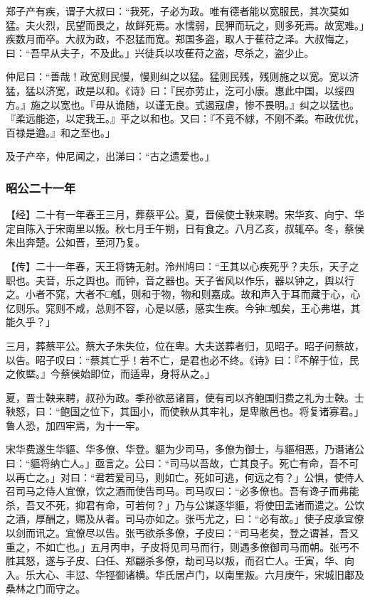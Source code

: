 \documentclass[]{article}
\begin{document}
郑子产有疾，谓子大叔曰：``我死，子必为政。唯有德者能以宽服民，其次莫如猛。夫火烈，民望而畏之，故鲜死焉。水懦弱，民狎而玩之，则多死焉。故宽难。」疾数月而卒。大叔为政，不忍猛而宽。郑国多盗，取人于萑苻之泽。大叔悔之，曰：``吾早从夫子，不及此。」兴徒兵以攻萑苻之盗，尽杀之，盗少止。

仲尼曰：``善哉！政宽则民慢，慢则纠之以猛。猛则民残，残则施之以宽。宽以济猛，猛以济宽，政是以和。《诗》曰：『民亦劳止，汔可小康。惠此中国，以绥四方。』施之以宽也。『毋从诡随，以谨无良。式遏寇虐，惨不畏明。』纠之以猛也。『柔远能迩，以定我王。』平之以和也。又曰：『不竞不絿，不刚不柔。布政优优，百禄是遒。』和之至也。」

及子产卒，仲尼闻之，出涕曰：``古之遗爱也。」

\hypertarget{header-n2712}{%
\subsubsection{昭公二十一年}\label{header-n2712}}

【经】二十有一年春王三月，葬蔡平公。夏，晋侯使士鞅来聘。宋华亥、向宁、华定自陈入于宋南里以叛。秋七月壬午朔，日有食之。八月乙亥，叔辄卒。冬，蔡侯朱出奔楚。公如晋，至河乃复。

【传】二十一年春，天王将铸无射。泠州鸠曰：``王其以心疾死乎？夫乐，天子之职也。夫音，乐之舆也。而钟，音之器也。天子省风以作乐，器以钟之，舆以行之。小者不窕，大者不□瓠，则和于物，物和则嘉成。故和声入于耳而藏于心，心亿则乐。窕则不咸，总则不容，心是以感，感实生疾。今钟□瓠矣，王心弗堪，其能久乎？」

三月，葬蔡平公。蔡大子朱失位，位在卑。大夫送葬者归，见昭子。昭子问蔡故，以告。昭子叹曰：``蔡其亡乎！若不亡，是君也必不终。《诗》曰：『不解于位，民之攸塈。』今蔡侯始即位，而适卑，身将从之。」

夏，晋士鞅来聘，叔孙为政。季孙欲恶诸晋，使有司以齐鲍国归费之礼为士鞅。士鞅怒，曰：``鲍国之位下，其国小，而使鞅从其牢礼，是卑敝邑也。将复诸寡君。」鲁人恐，加四牢焉，为十一牢。

宋华费遂生华貙、华多僚、华登。貙为少司马，多僚为御士，与貙相恶，乃谮诸公曰：``貙将纳亡人。」亟言之。公曰：``司马以吾故，亡其良子。死亡有命，吾不可以再亡之。」对曰：``君若爱司马，则如亡。死如可逃，何远之有？」公惧，使侍人召司马之侍人宜僚，饮之酒而使告司马。司马叹曰：``必多僚也。吾有谗子而弗能杀，吾又不死，抑君有命，可若何？」乃与公谋逐华貙，将使田孟诸而遣之。公饮之酒，厚酬之，赐及从者。司马亦如之。张丐尤之，曰：``必有故。」使子皮承宜僚以剑而讯之。宜僚尽以告。张丐欲杀多僚，子皮曰：``司马老矣，登之谓甚，吾又重之，不如亡也。」五月丙申，子皮将见司马而行，则遇多僚御司马而朝。张丐不胜其怒，遂与子皮、臼任、郑翩杀多僚，劫司马以叛，而召亡人。壬寅，华、向入。乐大心、丰愆、华牼御诸横。华氏居卢门，以南里叛。六月庚午，宋城旧鄘及桑林之门而守之。
\end{document}
